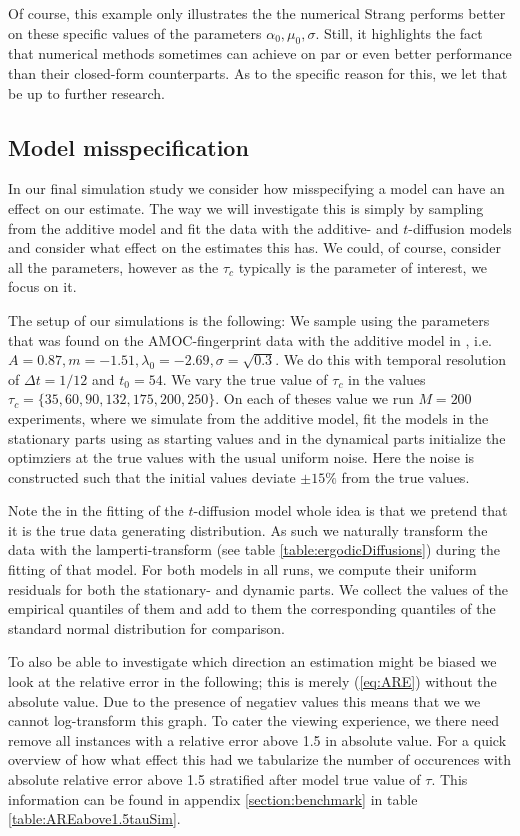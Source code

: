 Of course, this example only illustrates the the numerical Strang performs better on these specific values of the parameters $\alpha_0, \mu_0, \sigma$. Still, it highlights the fact that numerical methods sometimes can achieve on par or even better performance than their closed-form counterparts. As to the specific reason for this, we let that be up to further research.
\subsection{Model misspecification}
In our final simulation study we consider how misspecifying a model can have an effect on our estimate. The way we will investigate this is simply by sampling from the additive model and fit the data with the additive- and $t$-diffusion models and consider what effect on the estimates this has. We could, of course, consider all the parameters, however as the $\tau_c$ typically is the parameter of interest, we focus on it. 

The setup of our simulations is the following: We sample using the parameters that was found on the AMOC-fingerprint data with the additive model in \cite[figure 6]{Ditlevsen2023}, i.e. $A = 0.87, m = -1.51, \lambda_0 = -2.69, \sigma = \sqrt{0.3}$. We do this with temporal resolution of $\Delta t = 1/12$ and $t_0 =54$. We vary the true value of $\tau_c$ in the values $\tau_c = \{35, 60, 90, 132, 175, 200, 250\}$. On each of theses value we run $M = 200$ experiments, where we simulate from the additive model, fit the models in the stationary parts using \cite[equation (S4-S6)]{DitlevsenSupplementary} as starting values and in the dynamical parts initialize the optimziers at the true values with the usual uniform noise. Here the noise is constructed such that the initial values deviate $\pm 15\%$ from the true values.

Note the in the fitting of the $t$-diffusion model whole idea is that we pretend that it is the true data generating distribution. As such we naturally transform the data with the lamperti-transform (see table \ref{table:ergodicDiffusions}) during the fitting of that model. For both models in all runs, we compute their uniform residuals for both the stationary- and dynamic parts. We collect the values of the empirical quantiles of them and add to them the corresponding quantiles of the standard normal distribution for comparison.

To also be able to investigate which direction an estimation might be biased we look at the relative error in the following; this is merely (\ref{eq:ARE}) without the absolute value. Due to the presence of negatiev values this means that we we cannot log-transform this graph. To cater the viewing experience, we there need remove all instances with a relative error above 1.5 in absolute value. For a quick overview of how what effect this had we tabularize the number of occurences with absolute relative error above 1.5 stratified after model true value of $\tau$. This information can be found in appendix \ref{section:benchmark} in table \ref{table:AREabove1.5tauSim}. 

